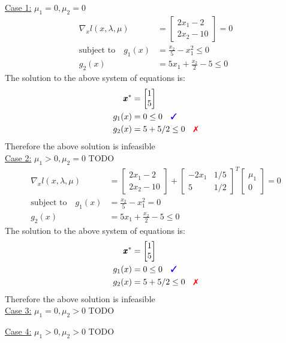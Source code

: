 \documentclass[a4paper,11pt]{article}
\newcommand{\V}[1]{\pmb{#1}}
\newcommand{\mat}[1]{\begin{bmatrix}#1\end{bmatrix}}
\newcommand{\cmark}{{\color{blue}\text{\ding{51}}}}%
\newcommand{\xmark}{{\color{red}\text{\ding{55}}}}%
\newcommand{\TODO}{{\color{red}TODO}}
\begin{document}
\noindent\underline{Case 1:} $\mu_1=0, \mu_2=0$
\begin{align*}
 \nabla_x l(x,\lambda,\mu) &= \mat{2x_1 -2\\ 2x_2-10}=0\\
 \text{subject to}\quad g_1(x)&=\frac{x_2}{5}-x_1^2 \leq 0\\
 g_2(x)&=5x_1 +\frac{x_2}{2}-5\leq 0
\end{align*}
The solution to the above system of equations is:
\begin{align*}
 \V{x}^* &= \mat{1\\5}\\
 g_1(x)&= 0 \leq 0 \quad\cmark\\
 g_2(x)&= 5+5/2 \leq 0 \quad\xmark
\end{align*}
Therefore the above solution is infeasible\\

\noindent\underline{Case 2:} $\mu_1>0,\mu_2=0$ \TODO
\begin{align*}
 \nabla_x l(x,\lambda,\mu) &= \mat{2x_1 -2\\ 2x_2-10} +\mat{-2x_1 & 1/5\\ 5& 1/2}^T\mat{\mu_1\\ 0} =0\\
 \text{subject to}\quad g_1(x)&=\frac{x_2}{5}-x_1^2 = 0\\
 g_2(x)&=5x_1 +\frac{x_2}{2}-5\leq 0
\end{align*}
The solution to the above system of equations is:
\begin{align*}
 \V{x}^* &= \mat{1\\5}\\
 g_1(x)&= 0 \leq 0 \quad\cmark\\
 g_2(x)&= 5+5/2 \leq 0 \quad\xmark
\end{align*}
Therefore the above solution is infeasible\\

\noindent\underline{Case 3:} $\mu_1=0, \mu_2>0$ \TODO

\noindent\underline{Case 4:} $\mu_1>0, \mu_2>0$ \TODO




\clearpage
\end{document}
